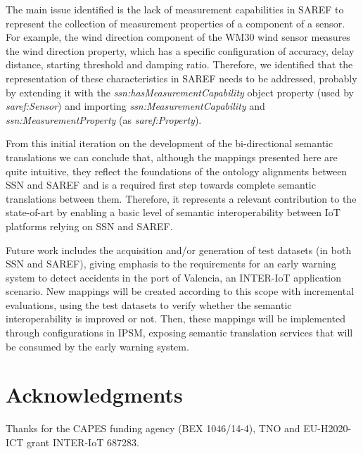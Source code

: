 \documentclass{sig-alternate-05-2015}
\begin{document}
The main issue identified is the lack of measurement capabilities in SAREF to represent the collection of measurement properties of a component of a sensor. For example, the wind direction component of the WM30 wind sensor measures the wind direction property, which has a specific configuration of accuracy, delay distance, starting threshold and damping ratio. Therefore, we identified that the representation of these characteristics in SAREF needs to be addressed, probably by extending it with the \textit{ssn:\-has\-Measurement\-Capability} object property (used by \textit{saref:\-Sensor}) and importing \textit{ssn:\-Measurement\-Capability} and \textit{ssn:\-Measurement\-Property} (as \textit{saref:\-Property}).

From this initial iteration on the development of the bi-directional semantic translations we can conclude that, although the mappings presented here are quite intuitive, they reflect the foundations of the ontology alignments between SSN and SAREF and is a required first step towards complete semantic translations between them. Therefore, it represents a relevant contribution to the state-of-art by enabling a basic level of semantic interoperability between IoT platforms relying on SSN and SAREF. 

Future work includes the acquisition and/or generation of test datasets (in both SSN and SAREF), giving emphasis to the requirements for an early warning system \cite{Moreira2017} to detect accidents in the port of Valencia, an INTER-IoT application scenario. New mappings will be created according to this scope with incremental evaluations, using the test datasets to verify whether the semantic interoperability is improved or not. Then, these mappings will be implemented through configurations in IPSM, exposing semantic translation services that will be consumed by the early warning system. 


\section{Acknowledgments}
Thanks for the CAPES funding agency (BEX 1046/14-4), TNO and EU-H2020-ICT grant INTER-IoT 687283.

%

%
%
\end{document}
